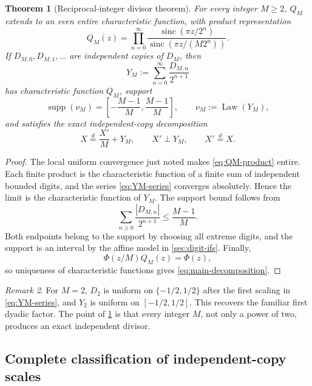 \documentclass[11pt,oneside]{article}
\newtheorem{theorem}{Theorem}[section]
\theoremstyle{definition}
\theoremstyle{remark}
\newtheorem{remark}[theorem]{Remark}
\newcommand{\sinc}{\operatorname{sinc}}
\newcommand{\supp}{\operatorname{supp}}
\numberwithin{equation}{section}
\newcommand{\Law}{\operatorname{Law}}
\newcommand{\1}{\mathbf 1}
\begin{document}
\begin{theorem}[Reciprocal-integer divisor theorem]
\label{thm:divisor}
For every integer $M\ge2$, $Q_M$ extends to an even entire characteristic function,
with product representation
\begin{equation}
 Q_M(z)=\prod_{n=0}^{\infty}
 \frac{\sinc(\pi z/2^n)}{\sinc(\pi z/(M2^n))}.
 \label{eq:QM-product}
\end{equation}
If $D_{M,0},D_{M,1},\ldots$ are independent copies of $D_M$, then
\begin{equation}
 Y_M:=\sum_{n=0}^{\infty}\frac{D_{M,n}}{2^{n+1}}
 \label{eq:YM-series}
\end{equation}
has characteristic function $Q_M$, support
\begin{equation}
 \supp(\nu_M)=\left[-\frac{M-1}{M},\frac{M-1}{M}\right],
 \qquad \nu_M:=\Law(Y_M),
 \label{eq:nu-support}
\end{equation}
and satisfies the exact independent-copy decomposition
\begin{equation}
 X\overset d=\frac{X'}{M}+Y_M,
 \qquad X'\perp Y_M,
 \qquad X'\overset d=X.
 \label{eq:main-decomposition}
\end{equation}
\end{theorem}

\begin{proof}
The local uniform convergence just noted makes \eqref{eq:QM-product} entire.  Each finite
product is the characteristic function of a finite sum of independent bounded digits, and
the series \eqref{eq:YM-series} converges absolutely.  Hence the limit is the
characteristic function of $Y_M$.  The support bound follows from
\[
 \sum_{n\ge0}\frac{|D_{M,n}|}{2^{n+1}}
 \le\frac{M-1}{M}.
\]
Both endpoints belong to the support by choosing all extreme digits, and the support is an
interval by the affine model in \cref{sec:digit-ifs}.  Finally,
\[
 \Phi(z/M)Q_M(z)=\Phi(z),
\]
so uniqueness of characteristic functions gives \eqref{eq:main-decomposition}.
\end{proof}

\begin{remark}
For $M=2$, $D_2$ is uniform on $\{-1/2,1/2\}$ after the first scaling in
\eqref{eq:YM-series}, and $Y_2$ is uniform on $[-1/2,1/2]$.  This recovers the
familiar first dyadic factor.  The point of \cref{thm:divisor} is that every integer
$M$, not only a power of two, produces an exact independent divisor.
\end{remark}

\subsection{Complete classification of independent-copy scales}
\end{document}
